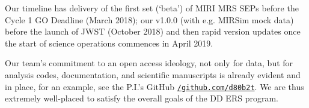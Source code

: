 \smallskip \smallskip
\noindent
Our timeline has delivery of the first set (`beta') of MIRI MRS SEPs
before the Cycle 1 GO Deadline (March 2018); our v1.0.0 (with
e.g. MIRSim mock data) before the launch of JWST (October 2018) and
then rapid version updates once the start of science operations
commences in April 2019.

\smallskip \smallskip
\noindent
Our team's commitment to an open access ideology, not only for data,
but for analysis codes, documentation, and scientific manuscripts is
already evident and in place, for an example, see the P.I.'s GitHub
\href{https://github.com/d80b2t}{{\tt /github.com/d80b2t}}.  We are
thus extremely well-placed to satisfy the overall goals of the DD ERS
program.


